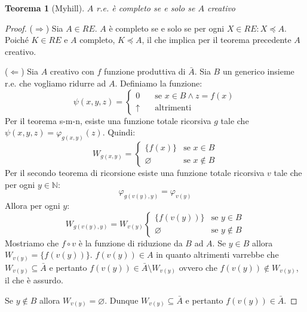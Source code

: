 \documentclass[a4paper,titlepage]{article}
\newtheorem{theorem}{Teorema}[section]
\theoremstyle{definition}
\newcommand{\N}{\mathbb{N}}
\begin{document}
	
\begin{theorem}[Myhill]
	$A$ r.e. è completo se e solo se $A$ creativo
\end{theorem}
\begin{proof}
	($\Rightarrow$) Sia $A\in RE$. $A$ è completo se e solo se per ogni $X\in RE: X\preceq A$. Poiché $K\in RE$ e $A$ completo, $K\preceq A$, il che implica per il teorema precedente $A$ creativo. 
	
	($\Leftarrow$) Sia $A$ creativo con $f$ funzione produttiva di $\bar A$. Sia $B$ un generico insieme r.e. che vogliamo ridurre ad $A$. Definiamo la funzione:
	\[
		\psi(x,y,z) =
		\begin{cases}
			0 &\quad\text{se }x\in B\land z=f(x)\\
			\uparrow &\quad\text{altrimenti }
		\end{cases}
	\]
	Per il teorema s-m-n, esiste una funzione totale ricorsiva $g$ tale che $\psi(x,y,z)=\varphi_{g(x,y)}(z)$. Quindi:
	\[
		W_{g(x,y)} =
		\begin{cases}
			\{f(x)\}&\text{se } x\in B\\
			\varnothing&\text{se } x\notin B
		\end{cases}
	\]
	Per il secondo teorema di ricorsione esiste una funzione totale ricorsiva $v$ tale che per ogni $y\in\N$:
	\[
		\varphi_{g(v(y),y)}=\varphi_{v(y)}
	\]
	Allora per ogni $y$:
	\[
		W_{g(v(y),y)}=W_{v(y)} 
		\begin{cases}
			\{f(v(y))\}&\text{se } y\in B\\
			\varnothing&\text{se } y\notin B
		\end{cases}
	\]
	Mostriamo che $f\circ v$ è la funzione di riduzione da $B$ ad $A$. Se $y\in B$ allora $W_{v(y)}=\{f(v(y))\}$. $f(v(y))\in A$ in quanto altrimenti varrebbe che $W_{v(y)}\subseteq\bar A$ e pertanto $f(v(y))\in\bar A\setminus W_{v(y)}$ ovvero che $f(v(y))\notin W_{v(y)}$, il che è assurdo. 
	
	Se $y\notin B$ allora $W_{v(y)}=\varnothing$. Dunque $W_{v(y)}\subseteq\bar A$ e pertanto $f(v(y))\in\bar A$.
\end{proof}
\end{document}
